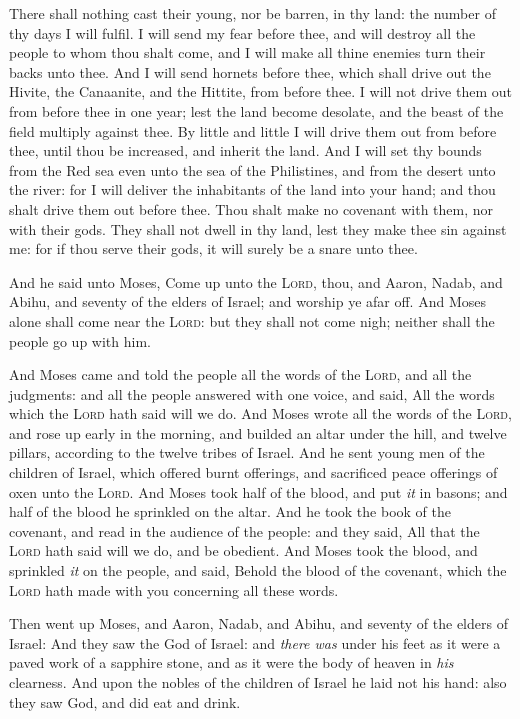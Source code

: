\documentclass[11pt,letterpaper,oneside]{memoir}
\begin{document}
There shall nothing cast their young, nor be barren, in thy land: the
number of thy days I will fulfil. I will send my fear before thee, and
will destroy all the people to whom thou shalt come, and I will make all
thine enemies turn their backs unto thee. And I will send hornets before
thee, which shall drive out the Hivite, the Canaanite, and the Hittite,
from before thee. I will not drive them out from before thee in one
year; lest the land become desolate, and the beast of the field multiply
against thee. By little and little I will drive them out from before
thee, until thou be increased, and inherit the land. And I will set thy
bounds from the Red sea even unto the sea of the Philistines, and from
the desert unto the river: for I will deliver the inhabitants of the
land into your hand; and thou shalt drive them out before thee. Thou
shalt make no covenant with them, nor with their gods. They shall not
dwell in thy land, lest they make thee sin against me: for if thou serve
their gods, it will surely be a snare unto thee.

And he said unto Moses, Come up unto the \textsc{Lord}, thou, and Aaron,
Nadab, and Abihu, and seventy of the elders of Israel; and worship ye
afar off. And Moses alone shall come near the \textsc{Lord}: but they
shall not come nigh; neither shall the people go up with him.

And Moses came and told the people all the words of the \textsc{Lord},
and all the judgments: and all the people answered with one voice, and
said, All the words which the \textsc{Lord} hath said will we do. And
Moses wrote all the words of the \textsc{Lord}, and rose up early in the
morning, and builded an altar under the hill, and twelve pillars,
according to the twelve tribes of Israel. And he sent young men of the
children of Israel, which offered burnt offerings, and sacrificed peace
offerings of oxen unto the \textsc{Lord}. And Moses took half of the
blood, and put \emph{it} in basons; and half of the blood he sprinkled
on the altar. And he took the book of the covenant, and read in the
audience of the people: and they said, All that the \textsc{Lord} hath
said will we do, and be obedient. And Moses took the blood, and
sprinkled \emph{it} on the people, and said, Behold the blood of the
covenant, which the \textsc{Lord} hath made with you concerning all
these words.

Then went up Moses, and Aaron, Nadab, and Abihu, and seventy of the
elders of Israel: And they saw the God of Israel: and \emph{there was}
under his feet as it were a paved work of a sapphire stone, and as it
were the body of heaven in \emph{his} clearness. And upon the nobles of
the children of Israel he laid not his hand: also they saw God, and did
eat and drink.
\end{document}
